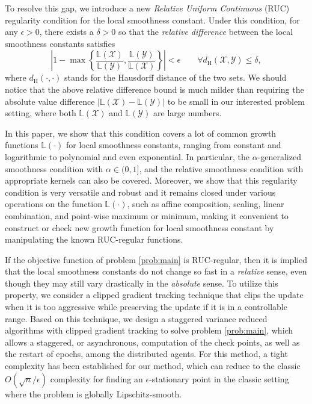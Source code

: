 \documentclass{article}
\newcommand{\cX}{\mathcal{X}}
\newcommand{\cY}{\mathcal{Y}}
\begin{document}
To resolve this gap, we introduce a new \emph{Relative Uniform Continuous} (RUC) regularity condition for the local
smoothness constant. Under this condition, for any $\epsilon>0$, there exists a $\delta>0$ so that the \emph{relative difference} between the local smoothness constants satisfies
$$\left|1-\max\left\{\frac{\mathbb{L}(\cX)}{\mathbb{L}(\cY)},\frac{\mathbb{L}(\cY)}{\mathbb{L}(\cX)}\right\}\right| < \epsilon \qquad \forall d_\mathrm{H}(\cX,\cY)\leq \delta,$$ 
where $d_\mathrm{H}(\cdot,\cdot)$ stands for the Hausdorff distance of the two sets. We should notice that the above relative difference bound is much milder than requiring the absolute value difference $|\mathbb{L}(\cX)-\mathbb{L}(\cY)|$ to be small in our interested problem setting, where both $\mathbb{L}(\cX)$ and $\mathbb{L}(\cY)$ are large numbers.  

In this paper, we show that this condition covers a lot of common growth
functions $\mathbb{L}(\cdot)$ for local smoothness constants, ranging from constant and logarithmic to polynomial and even exponential. In particular, the $\alpha$-generalized smoothness condition with $\alpha\in(0,1]$, and the relative smoothness condition with appropriate kernels can also be covered. Moreover, we show that this regularity condition is very versatile and robust and it remains closed under various operations on the function $\mathbb{L}(\cdot)$, such as affine composition, scaling, linear combination, and point-wise maximum or minimum, making it convenient to construct or check new growth function for local smoothness constant by manipulating the known RUC-regular functions.

If the objective function of problem \eqref{prob:main} is RUC-regular, then it is implied that the local smoothness constants do not change so fast in a \emph{relative} sense, even though they may still vary drastically in the \emph{absolute} sense. To utilize this property, we consider a clipped gradient tracking technique that clips the update when it is too aggressive while preserving the update if it is in a controllable range. Based on this technique, we design a staggered variance reduced algorithms with clipped gradient tracking to solve problem \eqref{prob:main}, which allows a staggered, or asynchronous, computation of the check points, as well as the restart of epochs, among the distributed agents. For this method, a tight complexity has been established for our method, which can reduce to the classic $O(\sqrt{n}/\epsilon)$ complexity for finding an $\epsilon$-stationary point in the classic setting where the problem is globally Lipschitz-smooth. 
 \vspace{0.3cm}
\end{document}
